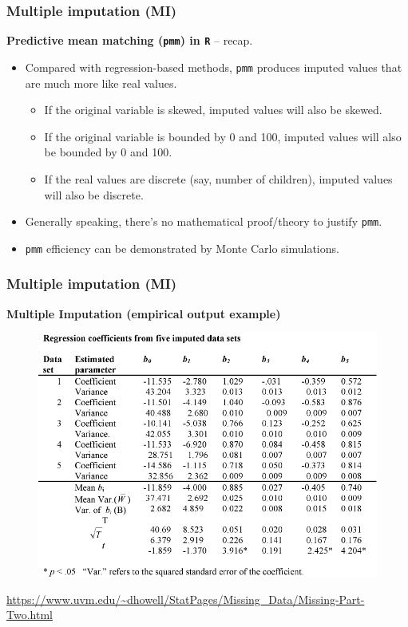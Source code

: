 \documentclass{beamer}
\begin{document}
\begin{frame}
\frametitle{Multiple imputation (MI)}
\textbf{Predictive mean matching (\texttt{pmm}) in \texttt{R}} -- recap.\\
\medskip
\begin{itemize}
    \item Compared with regression-based methods, \texttt{pmm} produces imputed values that are much more like real values. 
    \smallskip
    \begin{itemize}
        \item If the original variable is skewed, imputed values will also be skewed.
        \smallskip
        \item If the original variable is bounded by 0 and 100, imputed values will also be bounded by 0 and 100.
        \smallskip
        \item If the real values are discrete (say, number of children), imputed values will also be discrete. 
    \end{itemize} 
    \smallskip
    \item Generally speaking,  there’s no mathematical proof/theory to justify \texttt{pmm}.
    \smallskip
    \item \texttt{pmm} efficiency can be demonstrated by Monte Carlo simulations.
\end{itemize}
\end{frame}
\begin{frame}
\frametitle{Multiple imputation (MI)}
\textbf{Multiple Imputation (empirical output example) }
\begin{figure}
\includegraphics[width=0.7\linewidth]{IMG/mitable.jpg}
\end{figure}
\scriptsize{\url{https://www.uvm.edu/~dhowell/StatPages/Missing_Data/Missing-Part-Two.html}}
\end{frame}
\end{document}
